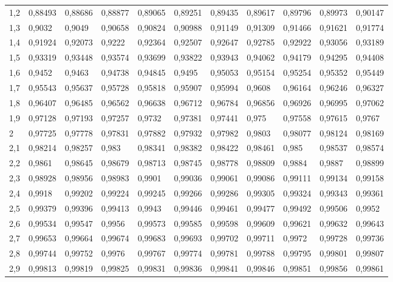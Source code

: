 \documentclass[addpoints,spanish, 12pt,a4paper]{exam}
\begin{document}
\begin{table}
\begin{tabular}{l|llllllllll}
1,2 & 0,88493 & 0,88686 & 0,88877 & 0,89065 & 0,89251 & 0,89435 & 0,89617 & 0,89796 & 0,89973 & 0,90147 \\
1,3 & 0,9032  & 0,9049  & 0,90658 & 0,90824 & 0,90988 & 0,91149 & 0,91309 & 0,91466 & 0,91621 & 0,91774 \\
1,4 & 0,91924 & 0,92073 & 0,9222  & 0,92364 & 0,92507 & 0,92647 & 0,92785 & 0,92922 & 0,93056 & 0,93189 \\
1,5 & 0,93319 & 0,93448 & 0,93574 & 0,93699 & 0,93822 & 0,93943 & 0,94062 & 0,94179 & 0,94295 & 0,94408 \\
1,6 & 0,9452  & 0,9463  & 0,94738 & 0,94845 & 0,9495  & 0,95053 & 0,95154 & 0,95254 & 0,95352 & 0,95449 \\
1,7 & 0,95543 & 0,95637 & 0,95728 & 0,95818 & 0,95907 & 0,95994 & 0,9608  & 0,96164 & 0,96246 & 0,96327 \\
1,8 & 0,96407 & 0,96485 & 0,96562 & 0,96638 & 0,96712 & 0,96784 & 0,96856 & 0,96926 & 0,96995 & 0,97062 \\
1,9 & 0,97128 & 0,97193 & 0,97257 & 0,9732  & 0,97381 & 0,97441 & 0,975   & 0,97558 & 0,97615 & 0,9767  \\
2   & 0,97725 & 0,97778 & 0,97831 & 0,97882 & 0,97932 & 0,97982 & 0,9803  & 0,98077 & 0,98124 & 0,98169 \\
2,1 & 0,98214 & 0,98257 & 0,983   & 0,98341 & 0,98382 & 0,98422 & 0,98461 & 0,985   & 0,98537 & 0,98574 \\
2,2 & 0,9861  & 0,98645 & 0,98679 & 0,98713 & 0,98745 & 0,98778 & 0,98809 & 0,9884  & 0,9887  & 0,98899 \\
2,3 & 0,98928 & 0,98956 & 0,98983 & 0,9901  & 0,99036 & 0,99061 & 0,99086 & 0,99111 & 0,99134 & 0,99158 \\
2,4 & 0,9918  & 0,99202 & 0,99224 & 0,99245 & 0,99266 & 0,99286 & 0,99305 & 0,99324 & 0,99343 & 0,99361 \\
2,5 & 0,99379 & 0,99396 & 0,99413 & 0,9943  & 0,99446 & 0,99461 & 0,99477 & 0,99492 & 0,99506 & 0,9952  \\
2,6 & 0,99534 & 0,99547 & 0,9956  & 0,99573 & 0,99585 & 0,99598 & 0,99609 & 0,99621 & 0,99632 & 0,99643 \\
2,7 & 0,99653 & 0,99664 & 0,99674 & 0,99683 & 0,99693 & 0,99702 & 0,99711 & 0,9972  & 0,99728 & 0,99736 \\
2,8 & 0,99744 & 0,99752 & 0,9976  & 0,99767 & 0,99774 & 0,99781 & 0,99788 & 0,99795 & 0,99801 & 0,99807 \\
2,9 & 0,99813 & 0,99819 & 0,99825 & 0,99831 & 0,99836 & 0,99841 & 0,99846 & 0,99851 & 0,99856 & 0,99861 \\

\end{tabular}
\end{table}
\end{document}
